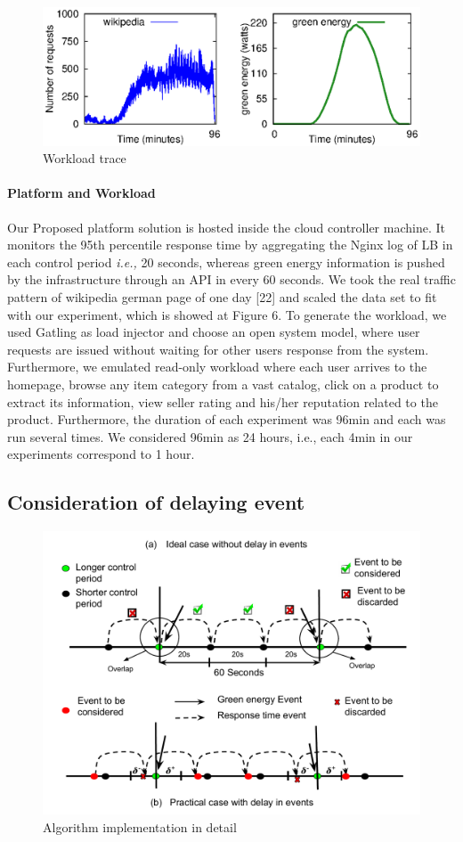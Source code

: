\begin{figure}[h]
\includegraphics[width=9.0 cm, height=2.8 cm]{Graphs/workload_ucc.eps}
\caption{Workload trace}
\label{fig:workload} 
\end{figure}

\paragraph*{\textbf{Platform and Workload}} Our Proposed platform solution is hosted inside the cloud controller
machine. It monitors the 95th percentile response
time by aggregating the Nginx log of LB in each control period \emph{i.e.,} 20 seconds, whereas green energy
information is pushed by the infrastructure through an API in every 60 seconds. We took the real traffic pattern of wikipedia german page of one day [22] and scaled the data set to fit with our experiment,
which is showed at Figure 6. To generate the workload, we used Gatling as load injector and choose an
open system model, where user requests are issued without
waiting for other users response from the system. Furthermore,
we emulated read-only workload where each user arrives to the homepage, browse any item category from a
vast catalog, click on a product to extract its information,
view seller rating and his/her reputation related to the
product. Furthermore, the duration
of each experiment was 96min and each was run several
times. We considered 96min as 24 hours, i.e., each 4min in
our experiments correspond to 1 hour.


\subsection{Consideration of delaying event}

\begin{figure} [htb]
\includegraphics[scale=.35]{Graphs/implementation_UCC.pdf}
\caption{Algorithm implementation in detail}
\label{fig:implementation} 
\end{figure}


